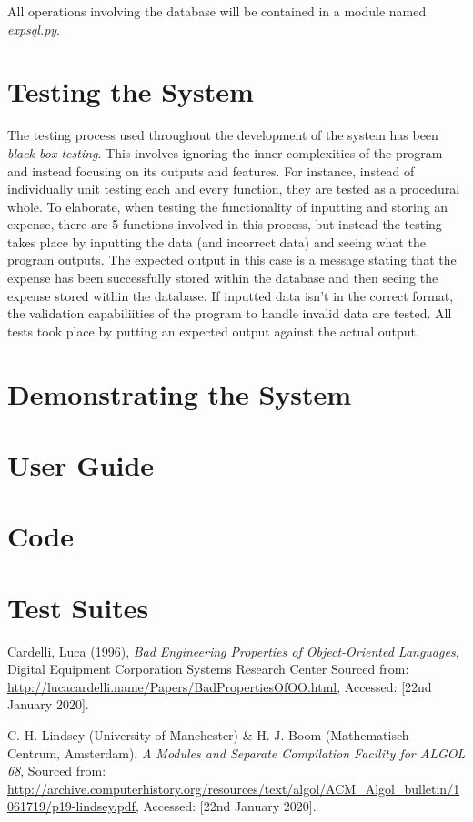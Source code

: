 \documentclass[12pt]{article}
\begin{document}
  All operations involving the database will be contained in a module named \textit{expsql.py}.

  \section{Testing the System}
  The testing process used throughout the development of the system has been \textit{black-box testing}. This involves ignoring the inner complexities of the program and instead focusing on its outputs and features. For instance, instead of individually unit testing each and every function, they are tested as a procedural whole. To elaborate, when testing the functionality of inputting and storing an expense, there are 5 functions involved in this process, but instead the testing takes place by inputting the data (and incorrect data) and seeing what the program outputs. The expected output in this case is a message stating that the expense has been successfully stored within the database and then seeing the expense stored within the database. If inputted data isn't in the correct format, the validation capabiliities of the program to handle invalid data are tested. All tests took place by putting an expected output against the actual output.
  \section{Demonstrating the System}

  \appendix
  \section{User Guide}
  \section{Code}
  \section{Test Suites}

  \begin{thebibliography}{9}
    Cardelli, Luca (1996),
    \textit{Bad Engineering Properties of Object-Oriented Languages},
    Digital Equipment Corporation Systems Research Center
    Sourced from: \url{http://lucacardelli.name/Papers/BadPropertiesOfOO.html},
    Accessed: [22nd January 2020].

    C. H. Lindsey (University of Manchester) \&
    H. J. Boom (Mathematisch Centrum, Amsterdam),
    \textit{A Modules and Separate Compilation Facility for ALGOL 68},
    Sourced from: \url{http://archive.computerhistory.org/resources/text/algol/ACM_Algol_bulletin/1061719/p19-lindsey.pdf},
    Accessed: [22nd January 2020].


  \end{thebibliography}
\end{document}
